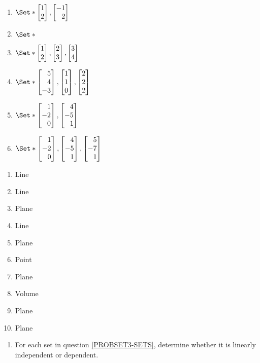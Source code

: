 \begin{exercises}
\begin{problist}
\begin{enumerate}
			\item $\Set*{\mat{1\\2},\mat{-1\\2}}$
			
			\item $\Set*{}$
			
			\item $\Set*{\mat{1\\2},\mat{2\\3},\mat{3\\4}}$
			
			\item $\Set*{\mat{5\\4\\-3},\mat{1\\1\\0},\mat{2\\2\\2}}$
			
			\item $\Set*{\mat{1\\-2\\0},\mat{4\\-5\\1}}$
			
			\item $\Set*{\mat{1\\-2\\0},\mat{4\\-5\\1},\mat{5\\-7\\1}}$
		\end{enumerate}
		\begin{solution}
			\begin{enumerate}
				\item Line
				\item Line
				\item Plane
				\item Line
				\item Plane
				\item Point
				\item Plane
				\item Volume
				\item Plane
				\item Plane
			\end{enumerate}
		\end{solution}
		
		\prob
		\begin{enumerate}
			\item For each set in question \ref{PROBSET3-SETS}, determine whether it is
			linearly independent or dependent.
			

\end{enumerate}
\end{problist}
\end{exercises}

